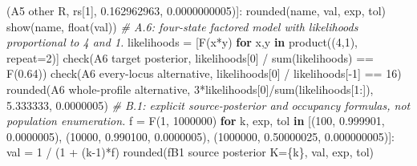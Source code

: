 \documentclass[
]{article}
\newenvironment{Shaded}{}{}
\newcommand{\BuiltInTok}[1]{\textcolor[rgb]{0.00,0.50,0.00}{#1}}
\newcommand{\CommentTok}[1]{\textcolor[rgb]{0.38,0.63,0.69}{\textit{#1}}}
\newcommand{\ControlFlowTok}[1]{\textcolor[rgb]{0.00,0.44,0.13}{\textbf{#1}}}
\newcommand{\DecValTok}[1]{\textcolor[rgb]{0.25,0.63,0.44}{#1}}
\newcommand{\FloatTok}[1]{\textcolor[rgb]{0.25,0.63,0.44}{#1}}
\newcommand{\KeywordTok}[1]{\textcolor[rgb]{0.00,0.44,0.13}{\textbf{#1}}}
\newcommand{\NormalTok}[1]{#1}
\newcommand{\OperatorTok}[1]{\textcolor[rgb]{0.40,0.40,0.40}{#1}}
\newcommand{\SpecialCharTok}[1]{\textcolor[rgb]{0.25,0.44,0.63}{#1}}
\newcommand{\SpecialStringTok}[1]{\textcolor[rgb]{0.73,0.40,0.53}{#1}}
\newcommand{\StringTok}[1]{\textcolor[rgb]{0.25,0.44,0.63}{#1}}
\begin{document}
\begin{Shaded}
\begin{Highlighting}[]
\NormalTok{        (}\StringTok{\textquotesingle{}A5 other R\textquotesingle{}}\NormalTok{, rs[}\DecValTok{1}\NormalTok{], }\FloatTok{0.162962963}\NormalTok{, }\FloatTok{0.0000000005}\NormalTok{)]:}
\NormalTok{        rounded(name, val, exp, tol)}
\NormalTok{        show(name, }\BuiltInTok{float}\NormalTok{(val))}
    \CommentTok{\# A.6: four{-}state factored model with likelihoods proportional to 4 and 1.}
\NormalTok{    likelihoods }\OperatorTok{=}\NormalTok{ [F(x}\OperatorTok{*}\NormalTok{y) }\ControlFlowTok{for}\NormalTok{ x,y }\KeywordTok{in}\NormalTok{ product((}\DecValTok{4}\NormalTok{,}\DecValTok{1}\NormalTok{), repeat}\OperatorTok{=}\DecValTok{2}\NormalTok{)]}
\NormalTok{    check(}\StringTok{\textquotesingle{}A6 target posterior\textquotesingle{}}\NormalTok{, likelihoods[}\DecValTok{0}\NormalTok{] }\OperatorTok{/} \BuiltInTok{sum}\NormalTok{(likelihoods) }\OperatorTok{==}\NormalTok{ F(}\StringTok{\textquotesingle{}0.64\textquotesingle{}}\NormalTok{))}
\NormalTok{    check(}\StringTok{\textquotesingle{}A6 every{-}locus alternative\textquotesingle{}}\NormalTok{, likelihoods[}\DecValTok{0}\NormalTok{] }\OperatorTok{/}\NormalTok{ likelihoods[}\OperatorTok{{-}}\DecValTok{1}\NormalTok{] }\OperatorTok{==} \DecValTok{16}\NormalTok{)}
\NormalTok{    rounded(}\StringTok{\textquotesingle{}A6 whole{-}profile alternative\textquotesingle{}}\NormalTok{, }\DecValTok{3}\OperatorTok{*}\NormalTok{likelihoods[}\DecValTok{0}\NormalTok{]}\OperatorTok{/}\BuiltInTok{sum}\NormalTok{(likelihoods[}\DecValTok{1}\NormalTok{:]), }\FloatTok{5.333333}\NormalTok{, }\FloatTok{0.0000005}\NormalTok{)}
    \CommentTok{\# B.1: explicit source{-}posterior and occupancy formulas, not population enumeration.}
\NormalTok{    f }\OperatorTok{=}\NormalTok{ F(}\DecValTok{1}\NormalTok{, }\DecValTok{1000000}\NormalTok{)}
    \ControlFlowTok{for}\NormalTok{ k, exp, tol }\KeywordTok{in}\NormalTok{ [(}\DecValTok{100}\NormalTok{, }\FloatTok{0.999901}\NormalTok{, }\FloatTok{0.0000005}\NormalTok{),}
\NormalTok{                        (}\DecValTok{10000}\NormalTok{, }\FloatTok{0.990100}\NormalTok{, }\FloatTok{0.0000005}\NormalTok{),}
\NormalTok{                        (}\DecValTok{1000000}\NormalTok{, }\FloatTok{0.50000025}\NormalTok{, }\FloatTok{0.000000005}\NormalTok{)]:}
\NormalTok{        val }\OperatorTok{=} \DecValTok{1} \OperatorTok{/}\NormalTok{ (}\DecValTok{1} \OperatorTok{+}\NormalTok{ (k}\OperatorTok{{-}}\DecValTok{1}\NormalTok{)}\OperatorTok{*}\NormalTok{f)}
\NormalTok{        rounded(}\SpecialStringTok{f\textquotesingle{}B1 source posterior K=}\SpecialCharTok{\{}\NormalTok{k}\SpecialCharTok{\}}\SpecialStringTok{\textquotesingle{}}\NormalTok{, val, exp, tol)}

\end{Highlighting}
\end{Shaded}
\end{document}
